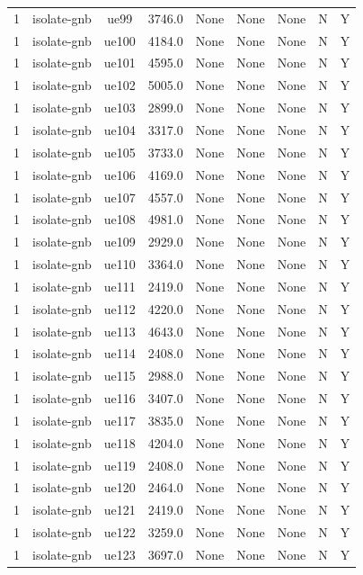 \begin{table}[ht]
\begin{tabular}{|c|c|c|c|c|c|c|c|c|}
1 & isolate-gnb & ue99 & 3746.0 & None & None & None & N & Y \\
1 & isolate-gnb & ue100 & 4184.0 & None & None & None & N & Y \\
1 & isolate-gnb & ue101 & 4595.0 & None & None & None & N & Y \\
1 & isolate-gnb & ue102 & 5005.0 & None & None & None & N & Y \\
1 & isolate-gnb & ue103 & 2899.0 & None & None & None & N & Y \\
1 & isolate-gnb & ue104 & 3317.0 & None & None & None & N & Y \\
1 & isolate-gnb & ue105 & 3733.0 & None & None & None & N & Y \\
1 & isolate-gnb & ue106 & 4169.0 & None & None & None & N & Y \\
1 & isolate-gnb & ue107 & 4557.0 & None & None & None & N & Y \\
1 & isolate-gnb & ue108 & 4981.0 & None & None & None & N & Y \\
1 & isolate-gnb & ue109 & 2929.0 & None & None & None & N & Y \\
1 & isolate-gnb & ue110 & 3364.0 & None & None & None & N & Y \\
1 & isolate-gnb & ue111 & 2419.0 & None & None & None & N & Y \\
1 & isolate-gnb & ue112 & 4220.0 & None & None & None & N & Y \\
1 & isolate-gnb & ue113 & 4643.0 & None & None & None & N & Y \\
1 & isolate-gnb & ue114 & 2408.0 & None & None & None & N & Y \\
1 & isolate-gnb & ue115 & 2988.0 & None & None & None & N & Y \\
1 & isolate-gnb & ue116 & 3407.0 & None & None & None & N & Y \\
1 & isolate-gnb & ue117 & 3835.0 & None & None & None & N & Y \\
1 & isolate-gnb & ue118 & 4204.0 & None & None & None & N & Y \\
1 & isolate-gnb & ue119 & 2408.0 & None & None & None & N & Y \\
1 & isolate-gnb & ue120 & 2464.0 & None & None & None & N & Y \\
1 & isolate-gnb & ue121 & 2419.0 & None & None & None & N & Y \\
1 & isolate-gnb & ue122 & 3259.0 & None & None & None & N & Y \\
1 & isolate-gnb & ue123 & 3697.0 & None & None & None & N & Y \\

\end{tabular}
\end{table}
